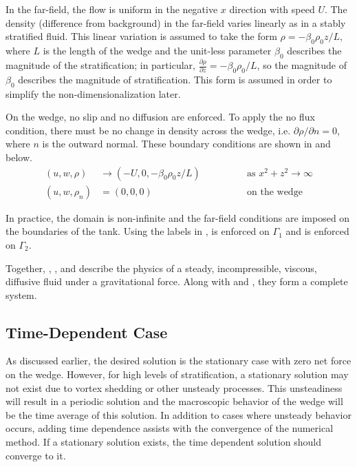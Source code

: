 \documentclass[12pt]{article}
\begin{document}
In the far-field, the flow is uniform in the negative $x$ direction with speed $U$. The density (difference from background) in the far-field varies linearly as in a stably stratified fluid. This linear variation is assumed to take the form $\rho=-\beta_0\rho_0z/L$, where $L$ is the length of the wedge and the unit-less parameter $\beta_0$ describes the magnitude of the stratification; in particular, $\frac{\partial\rho}{\partial{z}} = -\beta_0\rho_0/L$, so the magnitude of $\beta_0$ describes the magnitude of stratification. This form is assumed in order to simplify the non-dimensionalization later.

On the wedge, no slip and no diffusion are enforced. To apply the no flux condition, there must be no change in density across the wedge, i.e. $\partial\rho/\partial n=0$, where $n$ is the outward normal. These boundary conditions are shown in  and  below.
\begin{align}
\label{eq:farfieldbc}
(u,w,\rho)&\rightarrow(-U,0,-\beta_0\rho_0z/L)\qquad\qquad&\text{as } x^2+z^2\rightarrow\infty\\
\label{eq:wedgebc}
(u,w, \rho_n)&=(0,0,0)&\text{on the wedge}
\end{align}

In practice, the domain is non-infinite and the far-field conditions are imposed on the boundaries of the tank. Using the labels in ,  is enforced on $\Gamma_1$ and  is enforced on $\Gamma_2$.

Together, , , and  describe the physics of a steady, incompressible, viscous, diffusive fluid under a gravitational force. Along with  and , they form a complete system.

\subsection{Time-Dependent Case}

As discussed earlier, the desired solution is the stationary case with zero net force on the wedge. However, for high levels of stratification, a stationary solution may not exist due to vortex shedding or other unsteady processes. This unsteadiness will result in a periodic solution and the macroscopic behavior of the wedge will be the time average of this solution. In addition to cases where unsteady behavior occurs, adding time dependence assists with the convergence of the numerical method. If a stationary solution exists, the time dependent solution should converge to it.
\end{document}

